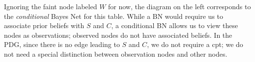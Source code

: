 \documentclass{article}
\newcommand{\MN}{PDG}
\newcommand{\MNs}{\MN s}
\numberwithin{equation}{section}
\begin{document}
\begin{example}
		Ignoring the faint node labeled $W$ for now, the diagram on the left
		corresponds to the \emph{conditional} Bayes Net \parencite{koller2009probabilistic} for this table.
		While a BN would require us to associate prior beliefs with $S$ and
		$C$, a conditional BN allows us to view these nodes as
		observations; observed nodes do not have associated beliefs.
		In the \MN, since there is no edge leading to $S$ and $C$, we
		do not require a cpt; we do not need a special distinction between
		observation nodes and other nodes.
				

\end{example}
\end{document}
